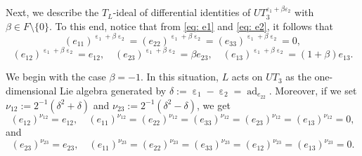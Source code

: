 \documentclass[a4paper,reqno]{amsart}
\theoremstyle{definition}
\numberwithin{equation}{section}
\numberwithin{theorem}{section}
\DeclareMathOperator{\e}{\varepsilon}
\DeclareMathOperator{\ad}{ad}
\newcommand{\black}{\color{black}}
\begin{document}
\black
 Next, we describe the $T_L$-ideal of differential identities of $ UT_3^{\varepsilon_1+ \beta\varepsilon_2} $ with $\beta \in F\setminus \{0\}$. 
 To this end, notice that from \eqref{eq: e1} and \eqref{eq: e2}, it follows that
\begin{equation*}
   (e_{11})^{\e_1+\beta\e_2} = (e_{22})^{\e_1+\beta\e_2} = (e_{33})^{\e_1+\beta\e_2} =0,
   \end{equation*}
   \begin{equation*}
    (e_{12})^{\e_1+\beta\e_2} = e_{12}, \quad  (e_{23})^{\e_1+\beta\e_2} = \beta e_{23}, \quad (e_{13})^{\e_1+\beta\e_2} = (1+\beta) e_{13}.
\end{equation*}

\smallskip

We begin with the case 
$\beta=-1$. In this situation, $L$ acts on $UT_3$ as the one-dimensional Lie algebra generated by $\delta:=\e_1-\e_2=\ad_{e_{22}}.$ Moreover, if we set $\nu_{12}:=2^{-1}(\delta^2+\delta)$ and $\nu_{23}:=2^{-1}(\delta^2-\delta)$, we get
\begin{equation}\label{eq: nu_12}
    (e_{12})^{\nu_{12}}=e_{12}, \quad (e_{11})^{\nu_{12}} = (e_{22})^{\nu_{12}} = (e_{33})^{\nu_{12}}= (e_{23})^{\nu_{12}}=(e_{13})^{\nu_{12}} =0,
\end{equation}
and
\begin{equation}\label{eq: nu_23}
   (e_{23})^{\nu_{23}}=e_{23}, \quad  (e_{11})^{\nu_{23}} = (e_{22})^{\nu_{23}} = (e_{33})^{\nu_{23}}= (e_{12})^{\nu_{23}}=(e_{13})^{\nu_{23}} =0.
\end{equation}
\end{document}
